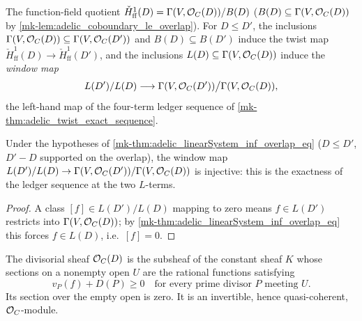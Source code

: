 \begin{definition}
  \label{mk-def:adelic_H1_window}
  \leanok
  The function-field quotient \(\check{H}^1_{\mathrm{ff}}(D) = \Gamma(V,
  \mathcal{O}_{C}(D))/B(D)\) (\(B(D) \subseteq \Gamma(V, \mathcal{O}_{C}(D))\) by
  \ref{mk-lem:adelic_coboundary_le_overlap}). For \(D \le D'\), the
  inclusions \(\Gamma(V, \mathcal{O}_{C}(D)) \subseteq \Gamma(V,
  \mathcal{O}_{C}(D'))\) and \(B(D) \subseteq B(D')\) induce the twist map
  \(\check{H}^1_{\mathrm{ff}}(D) \to
  \check{H}^1_{\mathrm{ff}}(D')\), and the inclusions \(L(D)
  \subseteq \Gamma(V, \mathcal{O}_{C}(D))\) induce the \emph{window map}
  \[
    L(D')/L(D) \longrightarrow \Gamma(V, \mathcal{O}_{C}(D'))\big/
      \Gamma(V, \mathcal{O}_{C}(D)),
  \]
  the left-hand map of the four-term ledger sequence of
  \ref{mk-thm:adelic_twist_exact_sequence}.
\end{definition}

\begin{theorem}
  \label{mk-thm:adelic_windowMap_injective}
  \leanok
  Under the hypotheses of \ref{mk-thm:adelic_linearSystem_inf_overlap_eq}
  (\(D \le D'\), \(D' - D\) supported on the overlap), the window map
  \(L(D')/L(D) \to \Gamma(V, \mathcal{O}_{C}(D'))/\Gamma(V, \mathcal{O}_{C}(D))\)
  is injective: this is the exactness of the ledger sequence at the two
  \(L\)-terms.
\end{theorem}
\begin{proof}
  \leanok
  A class \([f] \in L(D')/L(D)\) mapping to zero means \(f \in L(D')\)
  restricts into \(\Gamma(V, \mathcal{O}_{C}(D))\); by
  \ref{mk-thm:adelic_linearSystem_inf_overlap_eq} this forces \(f \in
  L(D)\), i.e.\ \([f] = 0\).
\end{proof}

\begin{definition}
  \label{mk-def:adelic_divisorial_sheaf}
  The divisorial sheaf \(\mathcal{O}_{C}(D)\) is the subsheaf of the constant
  sheaf \(K\) whose sections on a nonempty open \(U\) are the rational
  functions satisfying
  \[
    v_P(f)+D(P)\geq 0
    \quad\text{for every prime divisor }P\text{ meeting }U.
  \]
  Its section over the empty open is zero.  It is an invertible, hence
  quasi-coherent, \(\mathcal{O}_{C}\)-module.
\end{definition}

